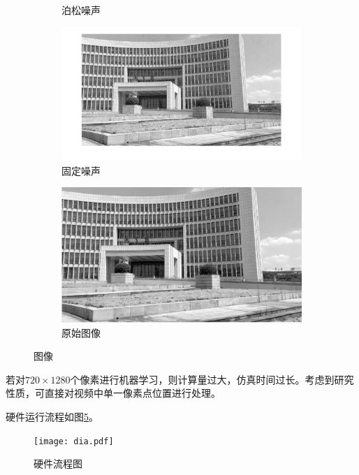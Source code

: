 \documentclass{article}
\newcounter{sub}
\begin{document}
\begin{figure}[htpb]
\begin{subfigure}[htpb]{.45\linewidth}
		\caption{泊松噪声}
		\label{fig:泊松噪声}
	\end{subfigure}
	\quad
	\begin{subfigure}[htpb]{.45\linewidth}
		\centering
		\includegraphics[width=\linewidth]{fixed.png}
		\caption{固定噪声}
		\label{fig:固定噪声}
	\end{subfigure}
	\quad
	\begin{subfigure}[htpb]{.45\linewidth}
		\centering
		\includegraphics[width=\linewidth]{origin.png}
		\caption{原始图像}
		\label{fig:原始图像}
	\end{subfigure}
	\quad
	\caption{图像}
	\label{fig:图像}
\end{figure}

若对$ 720\times 1280 $个像素进行机器学习，则计算量过大，仿真时间过长。考虑到研究性质，可直接对视频中单一像素点位置进行处理。

硬件运行流程如图\ref{fig:硬件流程图}。

\begin{figure}[htpb]
	\centering
	\texttt{[image: dia.pdf]}
	\caption{硬件流程图}
	\label{fig:硬件流程图}
\end{figure}
\end{document}
